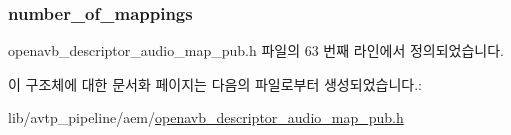 \subsubsection[{\texorpdfstring{number\+\_\+of\+\_\+mappings}{number_of_mappings}}]{ number\+\_\+of\+\_\+mappings}\hypertarget{structopenavb__aem__descriptor__audio__map__t_a26fd9d15c04581b52ba90aed9c4149c9}{}\label{structopenavb__aem__descriptor__audio__map__t_a26fd9d15c04581b52ba90aed9c4149c9}


openavb\+\_\+descriptor\+\_\+audio\+\_\+map\+\_\+pub.\+h 파일의 63 번째 라인에서 정의되었습니다.



이 구조체에 대한 문서화 페이지는 다음의 파일로부터 생성되었습니다.\+:\begin{DoxyCompactItemize}
\item 
lib/avtp\+\_\+pipeline/aem/\hyperlink{openavb__descriptor__audio__map__pub_8h}{openavb\+\_\+descriptor\+\_\+audio\+\_\+map\+\_\+pub.\+h}\end{DoxyCompactItemize}
